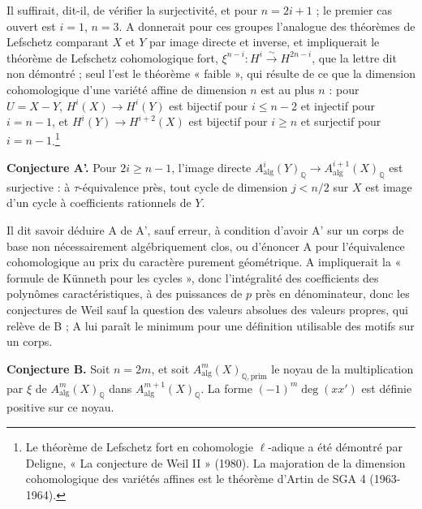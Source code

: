 \documentclass[11pt,a4paper]{article}
\begin{document}
Il suffirait, dit-il, de vérifier la surjectivité, et pour $n = 2i + 1$ ; le
premier cas ouvert est $i = 1$, $n = 3$. A donnerait pour ces groupes l'analogue
des théorèmes de Lefschetz comparant $X$ et $Y$ par image directe et inverse,
et impliquerait le théorème de Lefschetz cohomologique fort, $\xi^{n-i} \colon
H^{i} \xrightarrow{\sim} H^{2n-i}$, que la lettre dit non démontré ; seul l'est
le théorème « faible », qui résulte de ce que la dimension cohomologique d'une
variété affine de dimension $n$ est au plus $n$ : pour $U = X - Y$, $H^{i}(X)
\to H^{i}(Y)$ est bijectif pour $i \leqslant n - 2$ et injectif pour $i = n - 1$,
et $H^{i}(Y) \to H^{i+2}(X)$ est bijectif pour $i \geqslant n$ et surjectif pour
$i = n - 1$.\footnote{Le théorème de Lefschetz fort en cohomologie
$\ell$-adique a été démontré par Deligne, « La conjecture de Weil II »
(1980). La majoration de la dimension cohomologique des variétés affines est le
théorème d'Artin de SGA 4 (1963-1964).}

\textbf{Conjecture A'.} Pour $2i \geqslant n - 1$, l'image directe
$A^{i}_{\mathrm{alg}}(Y)_{\mathbb{Q}} \to A^{i+1}_{\mathrm{alg}}(X)_{\mathbb{Q}}$
est surjective : à $\tau$-équivalence près, tout cycle de dimension $j < n/2$
sur $X$ est image d'un cycle à coefficients rationnels de $Y$.

Il dit savoir déduire A de A', sauf erreur, à condition d'avoir A' sur un corps
de base non nécessairement algébriquement clos, ou d'énoncer A pour l'équivalence
cohomologique au prix du caractère purement géométrique. A impliquerait la
« formule de Künneth pour les cycles », donc l'intégralité des coefficients des
polynômes caractéristiques, à des puissances de $p$ près en dénominateur, donc
les conjectures de Weil sauf la question des valeurs absolues des valeurs
propres, qui relève de B ; A lui paraît le minimum pour une définition
utilisable des motifs sur un corps.

\textbf{Conjecture B.} Soit $n = 2m$, et soit
$A^{m}_{\mathrm{alg}}(X)_{\mathbb{Q},\mathrm{prim}}$ le noyau de la
multiplication par $\xi$ de $A^{m}_{\mathrm{alg}}(X)_{\mathbb{Q}}$ dans
$A^{m+1}_{\mathrm{alg}}(X)_{\mathbb{Q}}$. La forme $(-1)^{m}\deg(x x')$ est
définie positive sur ce noyau.
\end{document}
